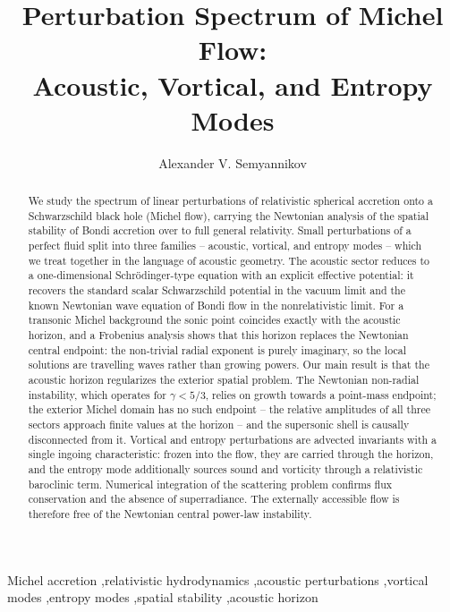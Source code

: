 \documentclass[12pt,a4paper,preprint,nopreprintline]{elsarticle}
\begin{document}
\makeatletter
\setlength{\@fptop}{0pt}%
\setlength{\@fpsep}{8pt}%
\setlength{\@fpbot}{0pt plus 1fil}%
\makeatother

\begin{frontmatter}

\title{Perturbation Spectrum of Michel Flow:\\
Acoustic, Vortical, and Entropy Modes}

\author{Alexander V. Semyannikov}
\address{Independent Researcher}

\begin{abstract}
We study the spectrum of linear perturbations of relativistic spherical accretion onto a Schwarzschild black hole (Michel flow), carrying the Newtonian analysis of the spatial stability of Bondi accretion over to full general relativity. Small perturbations of a perfect fluid split into three families -- acoustic, vortical, and entropy modes -- which we treat together in the language of acoustic geometry. The acoustic sector reduces to a one-dimensional Schr\"odinger-type equation with an explicit effective potential: it recovers the standard scalar Schwarzschild potential in the vacuum limit and the known Newtonian wave equation of Bondi flow in the nonrelativistic limit. For a transonic Michel background the sonic point coincides exactly with the acoustic horizon, and a Frobenius analysis shows that this horizon replaces the Newtonian central endpoint: the non-trivial radial exponent is purely imaginary, so the local solutions are travelling waves rather than growing powers. Our main result is that the acoustic horizon regularizes the exterior spatial problem. The Newtonian non-radial instability, which operates for $\gamma<5/3$, relies on growth towards a point-mass endpoint; the exterior Michel domain has no such endpoint -- the relative amplitudes of all three sectors approach finite values at the horizon -- and the supersonic shell is causally disconnected from it. Vortical and entropy perturbations are advected invariants with a single ingoing characteristic: frozen into the flow, they are carried through the horizon, and the entropy mode additionally sources sound and vorticity through a relativistic baroclinic term. Numerical integration of the scattering problem confirms flux conservation and the absence of superradiance. The externally accessible flow is therefore free of the Newtonian central power-law instability.
\end{abstract}

\begin{keyword}
Michel accretion \sep relativistic hydrodynamics \sep acoustic perturbations \sep vortical modes \sep entropy modes \sep spatial stability \sep acoustic horizon
\end{keyword}

\end{frontmatter}
\end{document}
